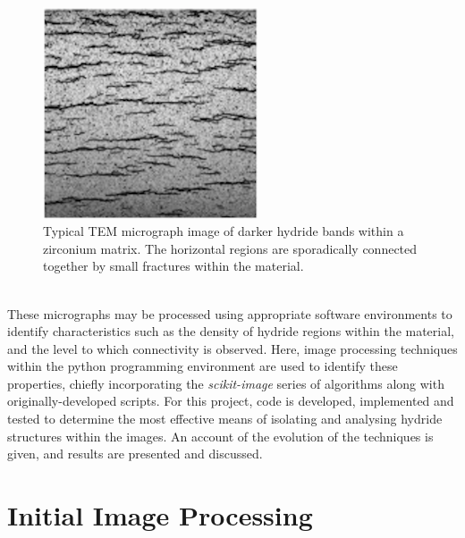 \documentclass{article}
\begin{document}
	\\
	\begin{figure}[h]
		\centering
		\includegraphics[width=2.5in]{Figures/tem_hydride_eg} 
		\caption{Typical TEM micrograph image of darker hydride bands within a zirconium matrix. The horizontal regions are sporadically connected together by small fractures within the material.}
		\label{fig:tem_hydride_eg}
	\end{figure}
	\\
	These micrographs may be processed using appropriate software environments to identify characteristics such as the density of hydride regions within the material, and the level to which connectivity is observed. Here, image processing techniques within the python programming environment are used to identify these properties, chiefly incorporating the \textit{scikit-image} series of algorithms along with originally-developed scripts. For this project, code is developed, implemented and tested to determine the most effective means of isolating and analysing hydride structures within the images. An account of the evolution of the techniques is given, and results are presented and discussed.
	
	\section{Initial Image Processing}
\end{document}
